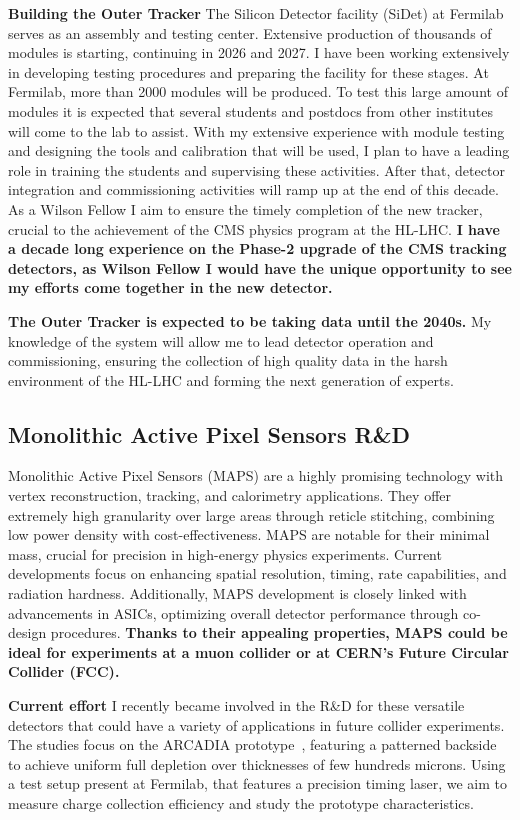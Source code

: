 {\begin{flushleft}
\textbf{Building the Outer Tracker}
The Silicon Detector facility (SiDet) at Fermilab serves as an assembly and testing center. Extensive production of thousands of modules is starting, continuing in 2026 and 2027. I have been working extensively in developing testing procedures and preparing the facility for these stages. At Fermilab, more than 2000 modules will be produced. To test this large amount of modules it is expected that several students and postdocs from other institutes will come to the lab to assist. With my extensive experience with module testing and designing the tools and calibration that will be used, I plan to have a leading role in training the students and supervising these activities. 
After that, detector integration and commissioning activities will ramp up at the end of this decade. As a Wilson Fellow I aim to ensure the timely completion of the new tracker, crucial to the achievement of the CMS physics program at the HL-LHC.
\textbf{I have a decade long experience on the Phase-2 upgrade of the CMS tracking detectors, as Wilson Fellow I would have the unique opportunity to see my efforts come together in the new detector.} 

{\bf The Outer Tracker is expected to be taking data until the 2040s.} My knowledge of the system will allow me to lead detector operation and commissioning, ensuring the collection of high quality data in the harsh environment of the HL-LHC and forming the next generation of experts.

\vskip 5pt 
\subsection{Monolithic Active Pixel Sensors R\&D}
\vskip 4pt
Monolithic Active Pixel Sensors (MAPS) are a highly promising technology with vertex reconstruction, tracking, and calorimetry applications. They offer extremely high granularity over large areas through reticle stitching, combining low power density with cost-effectiveness. MAPS are notable for their minimal mass, crucial for precision in high-energy physics experiments.
Current developments focus on enhancing spatial resolution, timing, rate capabilities, and radiation hardness. Additionally, MAPS development is closely linked with advancements in ASICs, optimizing overall detector performance through co-design procedures. {\bf Thanks to their appealing properties, MAPS could be ideal for experiments at a muon collider or at CERN's Future Circular Collider (FCC).}

\textbf{Current effort}
I recently became involved in the R\&D for these versatile detectors that could have a variety of applications in future collider experiments. The studies focus on the ARCADIA prototype~\cite{[8]}, featuring a patterned backside to achieve uniform full depletion over thicknesses of few hundreds microns. Using a test setup present at Fermilab, that features a precision timing laser, we aim to measure charge collection efficiency and study the prototype characteristics.


\end{flushleft}}
